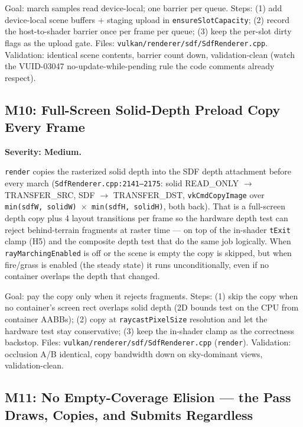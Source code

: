 \documentclass[11pt,a4paper]{article}
\begin{document}
\begin{tcolorbox}[promptbox={Prompt --- M9: device-local SDF scene buffers}]
Goal: march samples read device-local; one barrier per queue. Steps: (1) add
device-local scene buffers + staging upload in \texttt{ensureSlotCapacity};
(2) record the host-to-shader barrier once per frame per queue;
(3) keep the per-slot dirty flags as the upload gate. Files:
\texttt{vulkan/renderer/sdf/SdfRenderer.cpp}. Validation: identical scene
contents, barrier count down, validation-clean (watch the VUID-03047
no-update-while-pending rule the code comments already respect).
\end{tcolorbox}

\subsection{M10: Full-Screen Solid-Depth Preload Copy Every Frame}

\textbf{Severity: Medium.}

\texttt{render} copies the rasterized solid depth into the SDF depth
attachment before every march (\texttt{SdfRenderer.cpp:2141--2175}: solid
READ\_ONLY $\rightarrow$ TRANSFER\_SRC, SDF $\rightarrow$ TRANSFER\_DST,
\texttt{vkCmdCopyImage} over
\texttt{min(sdfW, solidW) $\times$ min(sdfH, solidH)}, both back). That is a
full-screen depth copy plus 4 layout transitions per frame so the hardware
depth test can reject behind-terrain fragments at raster time --- on top of
the in-shader \texttt{tExit} clamp (H5) and the composite depth test that do
the same job logically. When \texttt{rayMarchingEnabled} is off or the scene
is empty the copy is skipped, but when fire/grass is enabled (the steady
state) it runs unconditionally, even if no container overlaps the depth that
changed.

\begin{tcolorbox}[promptbox={Prompt --- M10: conditional depth preload}]
Goal: pay the copy only when it rejects fragments. Steps: (1) skip the copy
when no container's screen rect overlaps solid depth (2D bounds test on the
CPU from container AABBs); (2) copy at \texttt{raycastPixelSize} resolution
and let the hardware test stay conservative; (3) keep the in-shader clamp as
the correctness backstop. Files:
\texttt{vulkan/renderer/sdf/SdfRenderer.cpp} (\texttt{render}). Validation:
occlusion A/B identical, copy bandwidth down on sky-dominant views,
validation-clean.
\end{tcolorbox}

\subsection{M11: No Empty-Coverage Elision --- the Pass Draws, Copies, and Submits Regardless}
\end{document}
